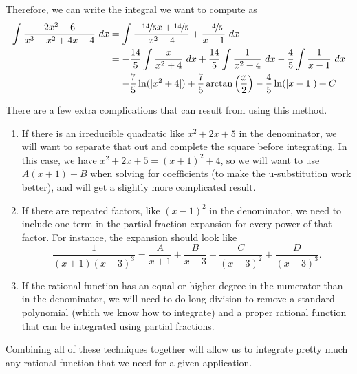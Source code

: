 \documentclass{ximera}
\begin{document}
\begin{exampleSol}
\begin{equation*}
    \end{equation*}
    Therefore, we can write the integral we want to compute as
    \begin{equation*}
        \begin{split}
            \int \frac{2x^2 - 6}{x^3 - x^2 + 4x - 4}\ dx &= \int  \frac{-\nicefrac{14}{5}x + \nicefrac{14}{5}}{x^2 + 4} + \frac{-\nicefrac{4}{5}}{x-1}\ dx \\
            &= -\frac{14}{5} \int \frac{x}{x^2 + 4}\ dx + \frac{14}{5} \int \frac{1}{x^2 + 4}\ dx - \frac{4}{5} \int \frac{1}{x-1}\ dx \\
            &= -\frac{7}{5}\ln(|x^2 + 4|) + \frac{7}{5} \arctan\left(\frac{x}{2}\right) - \frac{4}{5}\ln(|x-1|) + C
        \end{split}
    \end{equation*}
\end{exampleSol}

There are a few extra complications that can result from using this method.
\begin{enumerate}
    \item If there is an irreducible quadratic like $x^2 + 2x + 5$ in the denominator, we will want to separate that out and complete the square before integrating. In this case, we have $x^2 + 2x + 5 = (x+1)^2 + 4$, so we will want to use $A(x+1) + B$ when solving for coefficients (to make the u-substitution work better), and will get a slightly more complicated result.
    \item If there are repeated factors, like $(x-1)^2$ in the denominator, we need to include one term in the partial fraction expansion for every power of that factor. For instance, the expansion should look like
        \begin{equation*}
            \frac{1}{(x+1)(x-3)^3} = \frac{A}{x+1} + \frac{B}{x-3} + \frac{C}{(x-3)^2} + \frac{D}{(x-3)^3}.
    \end{equation*}
    \item If the rational function has an equal or higher degree in the numerator than in the denominator, we will need to do long division to remove a standard polynomial (which we know how to integrate) and a proper rational function that can be integrated using partial fractions.
\end{enumerate}

Combining all of these techniques together will allow us to integrate pretty much any rational function that we need for a given application. 
\end{document}
